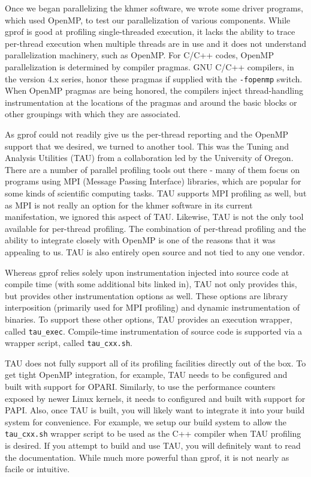 \documentclass{article}
\begin{document}
Once we began parallelizing the khmer software, we wrote some driver programs, which used OpenMP, to test our parallelization of various components. While gprof is good at profiling single-threaded execution, it lacks the ability to trace per-thread execution when multiple threads are in use and it does not understand parallelization machinery, such as OpenMP. For C/C++ codes, OpenMP parallelization is determined by compiler pragmas. GNU C/C++ compilers, in the version 4.x series, honor these pragmas if supplied with the \texttt{-fopenmp} switch. When OpenMP pragmas are being honored, the compilers inject thread-handling instrumentation at the locations of the pragmas and around the basic blocks or other groupings with which they are associated.


As gprof could not readily give us the per-thread reporting and the OpenMP support that we desired, we turned to another tool. This was the Tuning and Analysis Utilities (TAU) from a collaboration led by the University of Oregon. There are a number of parallel profiling tools out there - many of them focus on programs using MPI (Message Passing Interface) libraries, which are popular for some kinds of scientific computing tasks. TAU supports MPI profiling as well, but as MPI is not really an option for the khmer software in its current manifestation, we ignored this aspect of TAU. Likewise, TAU is not the only tool available for per-thread profiling. The combination of per-thread profiling and the ability to integrate closely with OpenMP is one of the reasons that it was appealing to us. TAU is also entirely open source and not tied to any one vendor.

Whereas gprof relies solely upon instrumentation injected into source code at compile time (with some additional bits linked in), TAU not only provides this, but provides other instrumentation options as well. These options are library interposition (primarily used for MPI profiling) and dynamic instrumentation of binaries. To support these other options, TAU provides an execution wrapper, called \texttt{tau\_exec}. Compile-time instrumentation of source code is supported via a wrapper script, called \texttt{tau\_cxx.sh}.

TAU does not fully support all of its profiling facilities directly out of the box. To get tight OpenMP integration, for example, TAU needs to be configured and built with support for OPARI. Similarly, to use the performance counters exposed by newer Linux kernels, it needs to configured and built with support for PAPI. Also, once TAU is built, you will likely want to integrate it into your build system for convenience. For example, we setup our build system to allow the \texttt{tau\_cxx.sh} wrapper script to be used as the C++ compiler when TAU profiling is desired. If you attempt to build and use TAU, you will definitely want to read the documentation. While much more powerful than gprof, it is not nearly as facile or intuitive.
\end{document}
